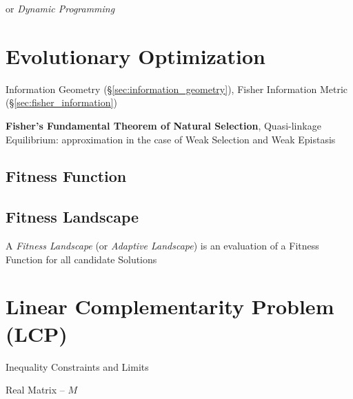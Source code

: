 or \emph{Dynamic Programming}



\section{Evolutionary Optimization}\label{sec:evolutionary_optimization}

\fist Information Geometry (\S\ref{sec:information_geometry}), Fisher
Information Metric (\S\ref{sec:fisher_information})

\fist \textbf{Fisher's Fundamental Theorem of Natural Selection},
Quasi-linkage Equilibrium: approximation in the case of Weak Selection
and Weak Epistasis %



\subsection{Fitness Function}\label{sec:fitness_function}

\subsection{Fitness Landscape}\label{sec:fitness_landscape}

A \emph{Fitness Landscape} (or \emph{Adaptive Landscape}) is an
evaluation of a Fitness Function for all candidate Solutions %



\section{Linear Complementarity Problem (LCP)}
\label{sec:linear_complementarity}


Inequality Constraints and Limits %

Real Matrix -- $M$

